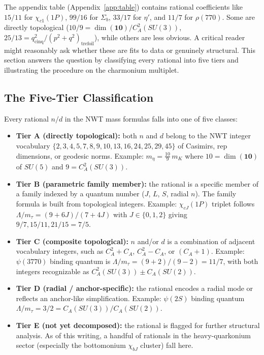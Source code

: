 \documentclass[11pt]{article}
\newcommand{\CA}{C_A}
\begin{document}
The appendix table (Appendix~\ref{app:table}) contains rational
coefficients like $15/11$ for $\chi_{c1}(1P)$, $99/16$ for
$\Sigma_b$, $33/17$ for $\eta'$, and $11/7$ for $\rho(770)$.
Some are directly topological ($10/9 = \dim(\mathbf{10})/\CA^2(SU(3))$,
$25/13 = q^2_\text{cinq}/(p^2+q^2)_\text{trefoil}$), while others
are less obvious.  A critical reader might reasonably ask whether
these are fits to data or genuinely structural.  This section
answers the question by classifying every rational into five
tiers and illustrating the procedure on the charmonium multiplet.

\subsection{The Five-Tier Classification}

Every rational $n/d$ in the NWT mass formulas falls into one of
five classes:
\begin{itemize}
\item
  \textbf{Tier A (directly topological):} both $n$ and $d$ belong
  to the NWT integer vocabulary
  $\{2, 3, 4, 5, 7, 8, 9, 10, 13, 16, 24, 25, 29, 45\}$ of
  Casimirs, rep dimensions, or geodesic norms.  Example:
  $m_\eta = \tfrac{10}{9}\,m_K$ where $10 = \dim(\mathbf{10})$ of
  $SU(5)$ and $9 = \CA^2(SU(3))$.
\item
  \textbf{Tier B (parametric family member):} the rational is a
  specific member of a family indexed by a quantum number
  ($J$, $L$, $S$, radial $n$).  The family formula is built
  from topological integers.  Example:
  $\chi_{cJ}(1P)$ triplet follows
  $\Lambda/m_\tau = (9+6J)/(7+4J)$
  with $J \in \{0,1,2\}$ giving $9/7, 15/11, 21/15=7/5$.
\item
  \textbf{Tier C (composite topological):} $n$ and/or $d$ is a
  combination of adjacent vocabulary integers, such as
  $C_A^2 + C_A$, $C_A^2 - C_A$, or $(C_A + 1)$.  Example:
  $\psi(3770)$ binding quantum is
  $\Lambda/m_\tau = (9+2)/(9-2) = 11/7$, with both integers
  recognizable as $\CA^2(SU(3)) \pm \CA(SU(2))$.
\item
  \textbf{Tier D (radial / anchor-specific):} the rational encodes
  a radial mode or reflects an anchor-like simplification.
  Example: $\psi(2S)$ binding quantum $\Lambda/m_\tau = 3/2 =
  \CA(SU(3))/\CA(SU(2))$.
\item
  \textbf{Tier E (not yet decomposed):} the rational is flagged
  for further structural analysis.  As of this writing, a handful
  of rationals in the heavy-quarkonium sector (especially the
  bottomonium $\chi_{bJ}$ cluster) fall here.
\end{itemize}
\end{document}
